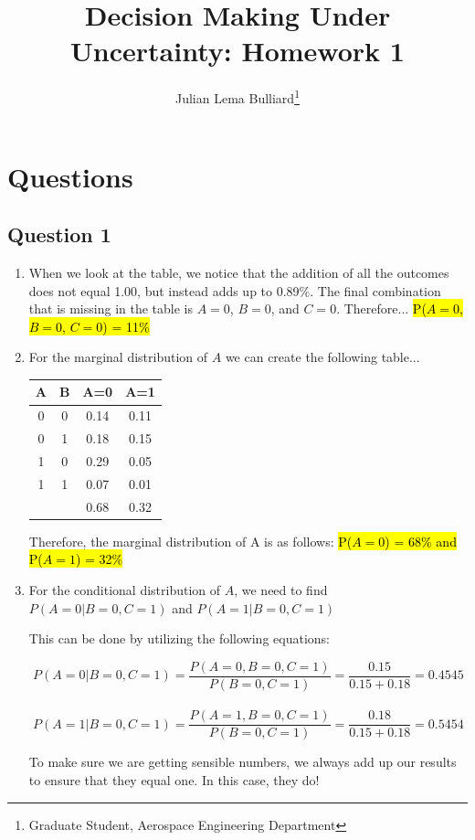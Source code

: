 \documentclass[conf]{new-aiaa}
\title{Decision Making Under Uncertainty: Homework 1}
\author{Julian Lema Bulliard\footnote{Graduate Student, Aerospace Engineering Department}}
\affil{University of Colorado Boulder}
\begin{document}
\maketitle

\section{Questions}

\subsection{Question 1}
\begin{enumerate}[label = \alph*)]
    \item When we look at the table, we notice that the addition of all the outcomes does not equal 1.00, but instead adds up to 0.89\%. The final combination that is missing in the table is $A = 0$, $B = 0$, and $C = 0$. Therefore...
        \hl{P($A = 0$, $B = 0$, $C = 0$) = 11\%}


    \item For the marginal distribution of $A$ we can create the following table...\\
        \begin{tabular}{cc|cc}
            A & B & A=0 & A=1\\
            \hline
            0 & 0 & 0.14 & 0.11\\
            0 & 1 & 0.18 & 0.15\\
            1 & 0 & 0.29 & 0.05\\
            1 & 1 & 0.07 & 0.01\\
            \hline
             & & 0.68 & 0.32\\
        \end{tabular}
        
        Therefore, the marginal distribution of A is as follows: \hl{P($A = 0$) = 68\% and P($A = 1$) = 32\%}

    \item For the conditional distribution of $A$, we need to find $P(A=0|B=0,C=1)$ and $P(A=1|B=0,C=1)$

    This can be done by utilizing the following equations:

    \[P(A=0|B=0,C=1) = \frac{P(A = 0 , B = 0 , C = 1)}{P(B = 0 , C = 1)} = \frac{0.15}{0.15 + 0.18} = 0.4545\]\\
    \[P(A=1|B=0,C=1) = \frac{P(A = 1 , B = 0 , C = 1)}{P(B = 0 , C = 1)} = \frac{0.18}{0.15 + 0.18} = 0.5454\]

    To make sure we are getting sensible numbers, we always add up our results to ensure that they equal one. In this case, they do! \\
\end{enumerate}
\pagebreak
\end{document}
